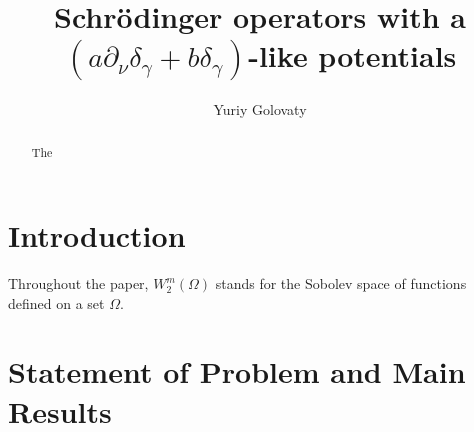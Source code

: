 \documentclass[reqno]{amsart}
\theoremstyle{plain}
\numberwithin{equation}{section}
\begin{document}
\title[Schr\"{o}dinger operators with a $(a\partial_\nu\delta_\gamma+b\delta_\gamma)$-like potentials]
{Schr\"{o}dinger operators with a $(a\partial_\nu\delta_\gamma+b\delta_\gamma)$-like potentials}





\author{Yuriy Golovaty}%
\address{Department of Mechanics and Mathematics,
  Ivan Franko National University of Lviv\\
  1 Universytetska str., 79000 Lviv, Ukraine}



\begin{abstract}
The
\end{abstract}


\keywords{}
\maketitle






\section{Introduction  }
\label{Sec:Introduction}




Throughout the paper, $W_2^m(\Omega)$ stands for the Sobolev space of functions defined on a set $\Omega$.








\section{Statement of Problem and Main Results}
\label{Sec:Statment}
\end{document}
